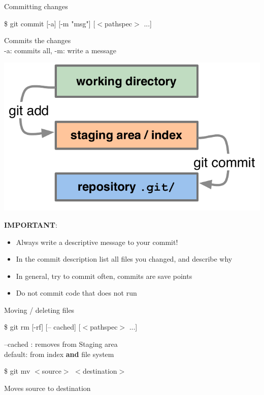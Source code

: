 \documentclass[10pt,xcolor=dvipsnames]{beamer}
\begin{document}
\begin{frame}{Committing changes}
\begin{block}{}
\$ git commit [-a] [-m "msg"] [$<$pathspec$>$ ...]
\end{block}
Commits the changes\\
-a: commits all,
-m: write a message
\begin{center}
\includegraphics[scale=0.3]{diagrams_add_commit-03.pdf}
\end{center}
\pause
{\bf IMPORTANT}:
\begin{itemize}
\item Always write a descriptive message to your commit!
\item In the commit description list all files you changed, and describe why
\item In general, try to commit often, commits are save points
\item Do not commit code that does not run
\end{itemize}

\end{frame}

\begin{frame}{Moving / deleting files}
\begin{block}{}
\$ git rm [-rf] [-- cached] [$<$pathspec$>$ ...]
\end{block}
--cached : removes from Staging area\\
default: from index {\bf and} file system\\[0.4in]
\begin{block}{}
\$ git mv $<$source$>$ $<$destination$>$
\end{block}
Moves source to destination
\end{frame}
\end{document}
